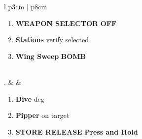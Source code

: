 \documentclass[8pt,usenames,dvipsnames,twoside]{article}
\begin{document}
\begin{center}
\begin{tabular}{l p{3cm} | p{8cm}}
\begin{minipage}[t]{\linewidth}
\begin{enumerate}[label=(\alph*)]
						\item \textbf{WEAPON SELECTOR} \dotfill \textbf{OFF}
						\item \textbf{Stations} \dotfill verify selected
						\item \textbf{Wing Sweep} \dotfill \textbf{BOMB}
					\end{enumerate} 
				\end{minipage} \\
				. &  &
				\begin{minipage}[t]{\linewidth}
					\vspace{-7pt}
					\begin{enumerate}[label=(\alph*)]
						\item \textbf{Dive}  deg
						\item \textbf{Pipper} \dotfill on target
						\item \textbf{STORE RELEASE} \dotfill \textbf{Press and Hold}
					\end{enumerate}
				\end{minipage} \\
				\bottomrule
			\end{tabular}
		\end{center}
		
\end{document}
